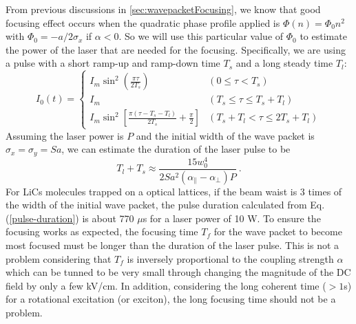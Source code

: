From previous
discussions in \autoref{sec:wavepacketFocusing}, we know that good focusing effect occurs when the quadratic 
phase profile applied is $\Phi(n) = \Phi_0 n^2$ with $\Phi_0 = -a/2\sigma_x$ if $\alpha<0$. So we will use this
 particular value of $\Phi_0$ to estimate the power of the laser that are needed for the focusing.  
Specifically, we are using a pulse with a short ramp-up and
ramp-down time $T_s$ and a long steady time $T_l$:
\begin{equation}
I_0 (t)=\left\{
\begin{array}{ll}
I_{m}\sin^2\left(\frac{\pi\tau}{2 T_{s}}\right) & (0\le \tau<T_s) \\
I_{m} & (T_s \le \tau \le T_s + T_{l}) \\
I_{m}\sin^2\left[\frac{\pi(\tau- T_s - T_{l}) }{2 T_{s}} +
\frac{\pi}{2}\right] & (T_s+ T_{l}<\tau \le 2T_s+ T_{l})
\end{array}
\right. \label{pulse-profile}
\end{equation}
Assuming the laser power is $P$ and the initial width of the wave
packet is $\sigma_x = \sigma_y = S a$, we can estimate the
duration of the laser pulse to be
\begin{equation}
T_l + T_s \approx \frac{15
w_0^4}{2Sa^2(\alpha_{\|}-\alpha_\perp)P} \ .
\label{pulse-duration}
\end{equation}
For LiCs molecules trapped on a optical lattices, if the beam
waist is 3 times of the width of the initial wave packet,  the
pulse duration calculated from Eq. (\ref{pulse-duration}) is about
770 $\mu$s for a laser power of 10 W. To ensure the focusing works
as expected, the focusing time $T_f$ for the wave packet to become
most focused must be longer than the duration of the laser pulse.
This is not a problem considering that $T_f$ is inversely
proportional to the coupling strength $\alpha$ which can be tunned
to be very small through changing the magnitude of the DC field
\cite{felipe} by only a few kV/cm. In addition, considering the
long coherent time ($> 1$s) for a rotational excitation (or
exciton), the long focusing time should not be a problem.




